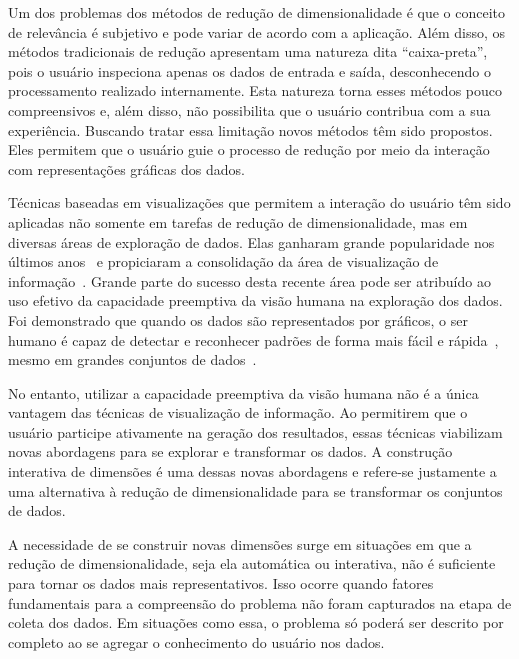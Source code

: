 Um dos problemas dos métodos de redução de dimensionalidade
é que o conceito de relevância é subjetivo e pode variar de
acordo com a aplicação. Além disso, os métodos tradicionais
de redução apresentam uma natureza dita ``caixa-preta'',
pois o usuário inspeciona apenas os dados de entrada e
saída, desconhecendo o processamento realizado internamente.
Esta natureza torna esses métodos pouco compreensivos e,
além disso, não possibilita que o usuário contribua com a sua
experiência. Buscando tratar essa limitação novos
métodos têm sido propostos. Eles permitem que o usuário
guie o processo de redução por meio da interação com
representações gráficas dos dados.

Técnicas baseadas em visualizações que permitem a
interação do usuário têm sido aplicadas não somente em
tarefas de redução de dimensionalidade, mas em diversas
áreas de exploração de dados. Elas ganharam grande
popularidade nos últimos anos~\cite{State2012} e propiciaram
a consolidação da área de visualização de
informação~\cite{Keim2002}. Grande parte do sucesso desta
recente área pode ser atribuído ao uso efetivo da capacidade
preemptiva da visão humana na exploração dos dados. Foi
demonstrado que quando os dados são representados por 
gráficos, o ser humano é capaz de detectar e reconhecer
padrões de forma mais fácil e rápida~\cite{Healey1995},
mesmo em grandes conjuntos de dados~\cite{Fodor2002}. 

No entanto, utilizar a capacidade preemptiva da visão humana
não é a única vantagem das técnicas de visualização de
informação. Ao permitirem que o usuário participe ativamente
na geração dos resultados, essas técnicas viabilizam novas
abordagens para se explorar e transformar os dados. A
construção interativa de dimensões é uma dessas novas
abordagens e refere-se justamente a uma alternativa à
redução de dimensionalidade para se transformar os conjuntos
de dados.

A necessidade de se construir novas dimensões surge em
situações em que a redução de dimensionalidade, seja ela
automática ou interativa, não é suficiente para tornar os
dados mais representativos. Isso ocorre quando fatores
fundamentais para a compreensão do problema não foram
capturados na etapa de coleta dos dados. Em situações como
essa, o problema só poderá ser descrito por completo ao se
agregar o conhecimento do usuário nos dados. 

